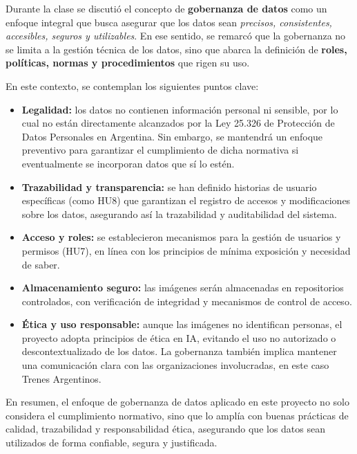 \documentclass[
11pt, %
]{ProyectoVpC}
\begin{document}
Durante la clase se discutió el concepto de \textbf{gobernanza de datos} como un enfoque integral que busca asegurar que los datos sean \textit{precisos, consistentes, accesibles, seguros y utilizables}. En ese sentido, se remarcó que la gobernanza no se limita a la gestión técnica de los datos, sino que abarca la definición de \textbf{roles, políticas, normas y procedimientos} que rigen su uso.

En este contexto, se contemplan los siguientes puntos clave:

\begin{itemize}
    \item \textbf{Legalidad:} los datos no contienen información personal ni sensible, por lo cual no están directamente alcanzados por la Ley 25.326 de Protección de Datos Personales en Argentina. Sin embargo, se mantendrá un enfoque preventivo para garantizar el cumplimiento de dicha normativa si eventualmente se incorporan datos que sí lo estén.
    
    \item \textbf{Trazabilidad y transparencia:} se han definido historias de usuario específicas (como HU8) que garantizan el registro de accesos y modificaciones sobre los datos, asegurando así la trazabilidad y auditabilidad del sistema.
    
    \item \textbf{Acceso y roles:} se establecieron mecanismos para la gestión de usuarios y permisos (HU7), en línea con los principios de mínima exposición y necesidad de saber.
    
    \item \textbf{Almacenamiento seguro:} las imágenes serán almacenadas en repositorios controlados, con verificación de integridad y mecanismos de control de acceso.
    
    \item \textbf{Ética y uso responsable:} aunque las imágenes no identifican personas, el proyecto adopta principios de ética en IA, evitando el uso no autorizado o descontextualizado de los datos. La gobernanza también implica mantener una comunicación clara con las organizaciones involucradas, en este caso Trenes Argentinos.
\end{itemize}

En resumen, el enfoque de gobernanza de datos aplicado en este proyecto no solo considera el cumplimiento normativo, sino que lo amplía con buenas prácticas de calidad, trazabilidad y responsabilidad ética, asegurando que los datos sean utilizados de forma confiable, segura y justificada.
\end{document}

